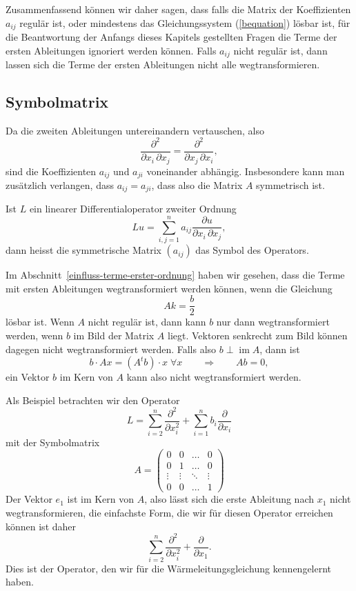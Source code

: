 Zusammenfassend können wir daher sagen, dass falls die Matrix der
Koeffizienten $a_{ij}$ regulär ist, oder mindestens das Gleichungssystem
(\ref{bequation}) lösbar ist, für die Beantwortung der Anfangs
dieses Kapitels gestellten Fragen die Terme der ersten Ableitungen
ignoriert werden können.
Falls $a_{ij}$ nicht regulär ist, dann lassen sich die Terme der
ersten Ableitungen nicht alle wegtransformieren.

\subsection{Symbolmatrix}
Da die zweiten Ableitungen untereinandern vertauschen, also 
\[
\frac{\partial^2}{\partial x_i\,\partial x_j}
=
\frac{\partial^2}{\partial x_j\,\partial x_i},
\]
sind die Koeffizienten $a_{ij}$ und $a_{ji}$ voneinander abhängig.
Insbesondere kann man zusätzlich verlangen, dass $a_{ij}=a_{ji}$,
dass also die Matrix $A$ symmetrisch ist.

\begin{definition}Ist $L$ ein linearer Differentialoperator zweiter Ordnung
\[
Lu=\sum_{i,j=1}^na_{ij}\frac{\partial u}{\partial x_i\,\partial x_j},
\]
dann heisst die symmetrische Matrix
$(a_{ij})$ das Symbol des Operators.
\end{definition}

Im Abschnitt~\ref{einfluss-terme-erster-ordnung} haben wir gesehen,
dass die Terme mit ersten Ableitungen wegtransformiert werden können,
wenn die Gleichung 
\[
Ak=\frac{b}2
\]
lösbar ist.
Wenn $A$ nicht regulär ist, dann kann $b$ nur dann wegtransformiert werden,
wenn $b$ im Bild der Matrix $A$ liegt.
Vektoren senkrecht zum Bild können dagegen nicht wegtransformiert werden.
Falls also $b\perp \operatorname{im} A$, dann ist
\[
b\cdot Ax=(A^tb)\cdot x\;\forall x
\qquad\Rightarrow\qquad
Ab=0,
\]
ein Vektor $b$ im Kern von $A$ kann also nicht wegtransformiert werden.

\begin{beispiel}
Als Beispiel betrachten wir den Operator 
\[
L
=
\sum_{i=2}^n\frac{\partial^2}{\partial x_i^2}
+
\sum_{i=1}^nb_i\frac{\partial}{\partial x_i}
\]
mit der Symbolmatrix
\[
A=\begin{pmatrix}
      0&      0& \dots&0\\
      0&      1& \dots&0\\
\vdots &\vdots &\ddots&\vdots\\
      0&      0&\dots &1
\end{pmatrix}
\]
Der Vektor $e_1$ ist im Kern von $A$, also lässt sich die erste
Ableitung nach $x_1$ nicht wegtransformieren, die einfachste
Form, die wir für diesen Operator erreichen können ist daher
\[
\sum_{i=2}^n\frac{\partial^2}{\partial x_i^2}
+
\frac{\partial}{\partial x_1}.
\]
Dies ist der Operator, den wir für die Wärmeleitungsgleichung
kennengelernt haben.
\end{beispiel}

